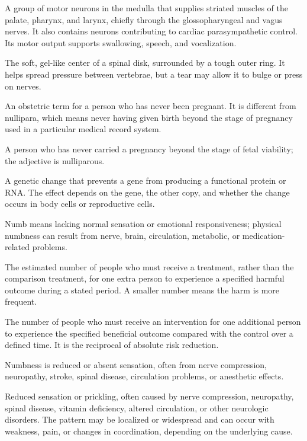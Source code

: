  A group of motor neurons in the medulla that supplies striated muscles of the palate, pharynx, and larynx, chiefly through the glossopharyngeal and vagus nerves. It also contains neurons contributing to cardiac parasympathetic control. Its motor output supports swallowing, speech, and vocalization.

 The soft, gel-like center of a spinal disk, surrounded by a tough outer ring. It helps spread pressure between vertebrae, but a tear may allow it to bulge or press on nerves.

 An obstetric term for a person who has never been pregnant. It is different from nullipara, which means never having given birth beyond the stage of pregnancy used in a particular medical record system.

 A person who has never carried a pregnancy beyond the stage of fetal viability; the adjective is nulliparous.

 A genetic change that prevents a gene from producing a functional protein or RNA. The effect depends on the gene, the other copy, and whether the change occurs in body cells or reproductive cells.

 Numb means lacking normal sensation or emotional responsiveness; physical numbness can result from nerve, brain, circulation, metabolic, or medication-related problems.

 The estimated number of people who must receive a treatment, rather than the comparison treatment, for one extra person to experience a specified harmful outcome during a stated period. A smaller number means the harm is more frequent.

 The number of people who must receive an intervention for one additional person to
experience the specified beneficial outcome compared with the control over a defined
time. It is the reciprocal of absolute risk reduction.

 Numbness is reduced or absent sensation, often from nerve compression, neuropathy, stroke, spinal disease, circulation problems, or anesthetic effects.

 Reduced sensation or prickling, often caused by nerve compression, neuropathy, spinal disease, vitamin deficiency, altered circulation, or other neurologic disorders. The pattern may be localized or widespread and can occur with weakness, pain, or changes in coordination, depending on the underlying cause.

